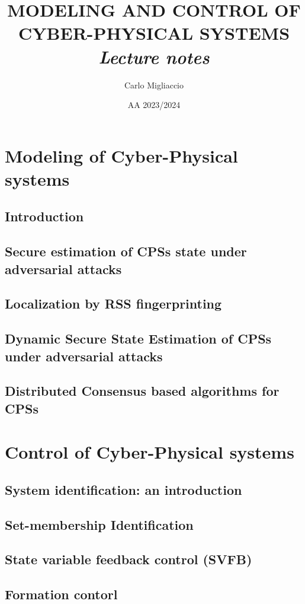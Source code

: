 \documentclass[a4paper, 12pt]{report}
\title{
    \textbf{  \Huge{  MODELING AND  CONTROL OF\\ 
    CYBER-PHYSICAL SYSTEMS } }\\
    \textit{Lecture notes}
}
\author{Carlo Migliaccio}
\date{AA 2023/2024}
\begin{document}
\maketitle
\tableofcontents

\part{Modeling of Cyber-Physical systems}
\chapter{Introduction}


\chapter{Secure estimation of CPSs state under adversarial attacks}


\chapter{Localization by RSS fingerprinting}


\chapter {Dynamic Secure State Estimation of CPSs under adversarial attacks}


\chapter{Distributed Consensus based algorithms for CPSs}



\part{Control of Cyber-Physical systems}
\chapter{System identification: an introduction}
\chapter{Set-membership Identification}
\chapter{State variable feedback control (SVFB)}
\chapter{Formation contorl}
\end{document}
